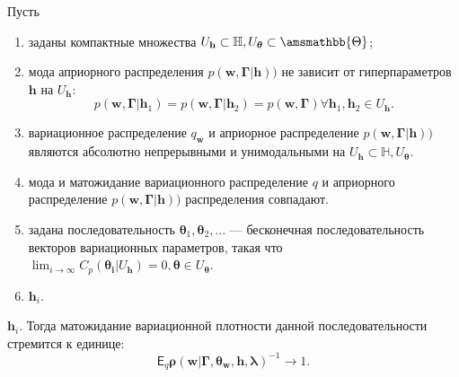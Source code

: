 \begin{theorem}
Пусть
\begin{enumerate}
\item заданы компактные множества $U_\mathbf{h} \subset \mathbb{H}, U_{\boldsymbol{\theta}} \subset \amsmathbb{\Theta}$;


\item мода априорного распределения $p(\mathbf{w},\boldsymbol{\Gamma}| \mathbf{h}))$ не зависит от гиперпараметров $\mathbf{h}$ на $U_\mathbf{h}$:
\[
    p(\mathbf{w},\boldsymbol{\Gamma}| \mathbf{h}_1) = p(\mathbf{w},\boldsymbol{\Gamma}| \mathbf{h}_2) =  p(\mathbf{w},\boldsymbol{\Gamma}) \forall \mathbf{h}_1,\mathbf{h}_2 \in U_{\mathbf{h}}. 
\]

\item вариационное распределение $q_\mathbf{w}$ и априорное распределение $p(\mathbf{w},\boldsymbol{\Gamma}| \mathbf{h}))$  являются абсолютно непрерывными и унимодальными на  $U_\mathbf{h} \subset \mathbb{H}, U_{\boldsymbol{\theta}}$.

\item мода и матожидание вариационного распределение $q$ и априорного распределение $p(\mathbf{w},\boldsymbol{\Gamma}| \mathbf{h}))$  распределения совпадают.

\item задана последовательность $\boldsymbol{\theta}_1,\boldsymbol{\theta}_2,\dots$ --- бесконечная последовательность векторов вариационных параметров, такая что $\lim_{i \to \infty}C_p(\boldsymbol{\theta_i}|U_{\mathbf{h}}) = 0, \boldsymbol{\theta} \in U_{\boldsymbol{\theta}}.$ 

\item $\mathbf{h}_i$. 
\end{enumerate}
$\mathbf{h}_i$.
Тогда матожидание вариационной плотности данной последовательности стремится к единице:
\[
   \mathsf{E}_q \boldsymbol{\rho}(\mathbf{w}|\boldsymbol{\Gamma}, \boldsymbol{\theta}_\mathbf{w}, \mathbf{h},\boldsymbol{\lambda})^{-1} \to 1.
\]


\end{theorem}

